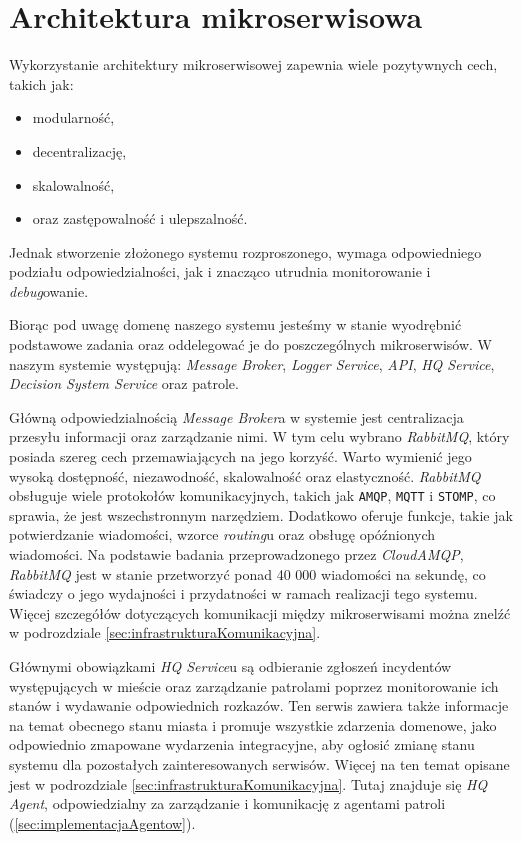 \section{Architektura mikroserwisowa}

\par Wykorzystanie architektury mikroserwisowej zapewnia wiele pozytywnych cech, takich jak: 
\begin{itemize}
    \item modularność,
    \item decentralizację,
    \item skalowalność,
    \item oraz zastępowalność i ulepszalność.
\end{itemize}
Jednak stworzenie złożonego systemu rozproszonego, wymaga odpowiedniego podziału odpowiedzialności, jak i znacząco utrudnia monitorowanie i \emph{debug}owanie.

\par Biorąc pod uwagę domenę naszego systemu jesteśmy w stanie wyodrębnić podstawowe zadania oraz oddelegować je do poszczególnych mikroserwisów. W naszym systemie występują: \emph{Message Broker}, \emph{Logger Service}, \emph{API}, \emph{HQ Service}, \emph{Decision System Service} oraz patrole.


\par Główną odpowiedzialnością \emph{Message Broker}a w systemie jest centralizacja przesyłu informacji oraz zarządzanie nimi. W tym celu wybrano \emph{RabbitMQ}, który posiada szereg cech przemawiających na jego korzyść. Warto wymienić jego wysoką dostępność, niezawodność, skalowalność oraz elastyczność. \emph{RabbitMQ} obsługuje wiele protokołów komunikacyjnych, takich jak \texttt{AMQP}, \texttt{MQTT} i \texttt{STOMP}, co sprawia, że jest wszechstronnym narzędziem. Dodatkowo oferuje funkcje, takie jak potwierdzanie wiadomości, wzorce \emph{routing}u oraz obsługę opóźnionych wiadomości. Na podstawie badania przeprowadzonego przez \emph{CloudAMQP}\cite{CLOUDAMQP_RABBITMQ_BENCHMARK}, \emph{RabbitMQ} jest w stanie przetworzyć ponad 40 000 wiadomości na sekundę, co świadczy o jego wydajności i przydatności w ramach realizacji tego systemu. Więcej szczegółów dotyczących komunikacji między mikroserwisami można znelźć w podrozdziale \ref{sec:infrastrukturaKomunikacyjna}.

\par Głównymi obowiązkami \emph{HQ Service}u są odbieranie zgłoszeń incydentów występujących w mieście oraz zarządzanie patrolami poprzez monitorowanie ich stanów i wydawanie odpowiednich rozkazów. Ten serwis zawiera także informacje na temat obecnego stanu miasta i promuje wszystkie zdarzenia domenowe, jako odpowiednio zmapowane wydarzenia integracyjne, aby ogłosić zmianę stanu systemu dla pozostałych zainteresowanych serwisów. Więcej na ten temat opisane jest w podrozdziale \ref{sec:infrastrukturaKomunikacyjna}. Tutaj znajduje się \emph{HQ Agent}, odpowiedzialny za zarządzanie i komunikację z agentami patroli (\ref{sec:implementacjaAgentow}).

